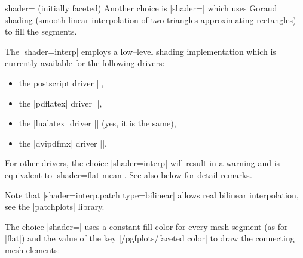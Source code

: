 {\begin{pgfplotskey}{shader= (initially faceted)}
	Another choice is |shader=| which uses Goraud shading (smooth linear interpolation of two triangles approximating rectangles) to fill the segments. 

\pgfplotsexpensiveexample
\begin{codeexample}[]
\end{codeexample}

	The |shader=interp| employs a low--level shading implementation which is currently available for the following drivers:
	\begin{itemize}
		\item the postscript driver |\def\pgfsysdriver{pgfsys-dvips.def}|,
		\item the |pdflatex| driver |\def\pgfsysdriver{pgfsys-pdftex.def}|,
		\item the |lualatex| driver |\def\pgfsysdriver{pgfsys-pdftex.def}| (yes, it is the same),
		\item the |dvipdfmx| driver |\def\pgfsysdriver{pgfsys-dvipdfmx.def}|.
	\end{itemize}
	For other drivers, the choice |shader=interp| will result in a warning and is equivalent to |shader=flat mean|. See also below for detail remarks.
	
	Note that |shader=interp,patch type=bilinear| allows real bilinear interpolation, see the |patchplots| library.


	The choice |shader=| uses a constant fill color for every mesh segment (as for |flat|) and the value of the key |/pgfplots/faceted color| to draw the connecting mesh elements:
\pgfplotsexpensiveexample
\begin{codeexample}[]
\end{codeexample}


\end{pgfplotskey}}

